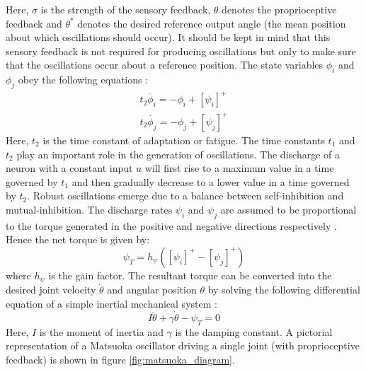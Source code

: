\documentclass[12pt,twoside]{article}
\theoremstyle{plain}
\theoremstyle{definition}
\theoremstyle{remark}
\begin{document}
Here, $\sigma$ is the strength of the sensory feedback, $\theta$ denotes the proprioceptive feedback and $\theta^{*}$ denotes the desired reference output angle (the mean position about which oscillations should occur). It should be kept in mind that this sensory feedback is not required for producing oscillations but only to make sure that the oscillations occur about a reference position. The state variables $\phi_i$ and $\phi_j$ obey the following equations \cite{Ronsse2009}: 
\begin{subequations} 
\label{eq:matsuoka_phi}
\begin{align}
 t_2 \dot{\phi_i}=-\phi_i + [\psi_i]^+\\
 t_2 \dot{\phi_j}=-\phi_j + [\psi_j]^+
 \end{align}
\end{subequations}
Here, $t_2$ is the time constant of adaptation or fatigue. The time constants $t_1$ and $t_2$ play an important role in the generation of oscillations. The discharge of a neuron with a constant input $u$ will first rise to a maximum value in a time governed by $t_1$ and then gradually decrease to a lower value in a time governed by $t_2$. Robust oscillations emerge due to a balance between self-inhibition and mutual-inhibition. The discharge rates $\psi_i$ and $\psi_j$ are assumed to be proportional to the torque generated in the positive and negative directions respectively \cite{Ronsse2009}. Hence the net torque is given by: 
\begin{equation}
\label{eq:matsuoka_net_torque}
\psi_T=h_{\psi}([\psi_i]^+ - [\psi_j]^+)
\end{equation}
where $h_{\psi}$ is the gain factor. The resultant torque can be converted into the desired joint velocity $\dot{\theta}$ and angular position $\theta$ by solving the following differential equation of a simple inertial mechanical system \cite{Ronsse2009}:
\begin{equation}
\label{eq:inertial_system}
I\ddot{\theta} + \gamma \dot{\theta} - \psi_T = 0
\end{equation}
Here, $I$ is the moment of inertia and $\gamma$ is the damping constant. A pictorial representation of a Matsuoka oscillator driving a single joint (with proprioceptive feedback) is shown in figure \ref{fig:matsuoka_diagram}.
\end{document}

